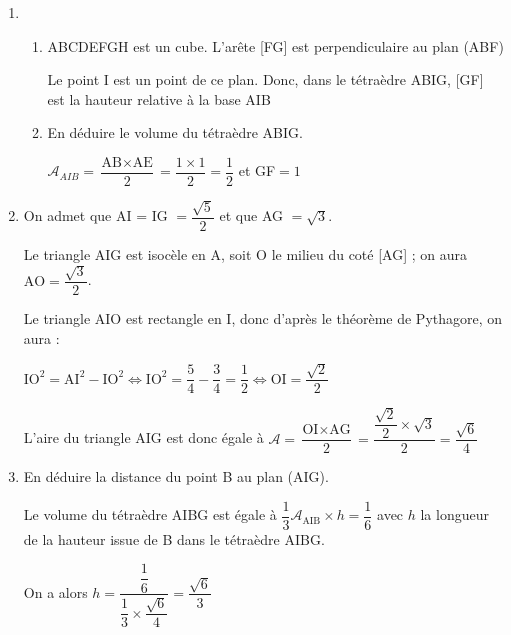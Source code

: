 \documentclass[11pt]{article}
\begin{document}
\begin{enumerate}
\item 
	\begin{enumerate}
		\item %
ABCDEFGH est un cube. L’arête  [FG] est perpendiculaire au plan (ABF)

Le point I est un point de ce plan.  Donc, dans le tétraèdre ABIG, [GF] est la hauteur relative à la base AIB


		\item En déduire le volume du tétraèdre ABIG.
		
$\mathscr{A}_{AIB}=\dfrac{\text{AB} \times \text{AE}}{2}=\dfrac{1\times 1}{2}=\dfrac{1}{2}$ et GF$=1$
	\end{enumerate}
\item On admet que AI = IG $= \dfrac{\sqrt{5}}{2}$ et que AG $= \sqrt 3$.

Le triangle AIG est isocèle en A, soit O le milieu du coté [AG] ; on aura $\text{AO}=\dfrac{\sqrt{3}}{2}$.

Le triangle AIO est rectangle en I, donc d'après le théorème de Pythagore,  on aura :


$\text{IO}^2=\text{AI}^2-\text{IO}^2\iff \text{IO}^2=\dfrac{5}{4}-\dfrac{3}{4}=\dfrac{1}{2} \iff \text{OI}=\dfrac{\sqrt{2}}{2}$

L'aire du triangle AIG est donc égale à $\mathscr{A}=\dfrac{\text{OI} \times \text{AG}}{2}=\dfrac{\dfrac{\sqrt{2}}{2}\times \sqrt{3}}{2}=\dfrac{\sqrt{6}}{4}$
\item En déduire la distance du point B au plan (AIG).

Le volume du tétraèdre AIBG est égale à $\dfrac{1}{3}\mathscr{A}_{\text{AIB}}\times h=\dfrac{1}{6}$ avec $h$ la longueur de la hauteur issue de B dans le tétraèdre AIBG.

On a alors $h=\dfrac{\dfrac{1}{6}}{\dfrac{1}{3}\times \dfrac{\sqrt{6}}{4}}=\dfrac{\sqrt{6}}{3}$
\end{enumerate}
\end{document}
